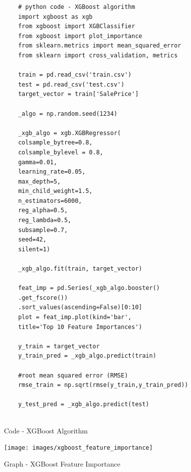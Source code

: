 \documentclass[sigconf]{acmart}
\begin{document}
	\begin{figure}[htb]
	\begin{verbatim}
	# python code - XGBoost algorithm
	import xgboost as xgb
	from xgboost import XGBClassifier
	from xgboost import plot_importance
	from sklearn.metrics import mean_squared_error
	from sklearn import cross_validation, metrics
	
	train = pd.read_csv('train.csv')
	test = pd.read_csv('test.csv')
	target_vector = train['SalePrice']
	
	_algo = np.random.seed(1234)
	
	_xgb_algo = xgb.XGBRegressor(
	colsample_bytree=0.8,
	colsample_bylevel = 0.8,
	gamma=0.01,
	learning_rate=0.05,
	max_depth=5,
	min_child_weight=1.5,
	n_estimators=6000,                                                                  
	reg_alpha=0.5,
	reg_lambda=0.5,
	subsample=0.7,
	seed=42,
	silent=1)
	
	_xgb_algo.fit(train, target_vector)   
	
	feat_imp = pd.Series(_xgb_algo.booster()
	.get_fscore())
	.sort_values(ascending=False)[0:10] 
	plot = feat_imp.plot(kind='bar', 
	title='Top 10 Feature Importances')
	
	y_train = target_vector
	y_train_pred = _xgb_algo.predict(train)
	
	#root mean squared error (RMSE)
	rmse_train = np.sqrt(rmse(y_train,y_train_pred))
	
	y_test_pred = _xgb_algo.predict(test)
	
	\end{verbatim}
	\caption{Code - XGBoost Algorithm} \label{c:xgb} 
	\end{figure}
	
	\begin{figure}[htb]
		\centering
		\texttt{[image: images/xgboost\_feature\_importance]}	
		\caption{Graph - XGBoost Feature Importance} \label{fig:xgb-feature-imp} 
	\end{figure}
\end{document}
